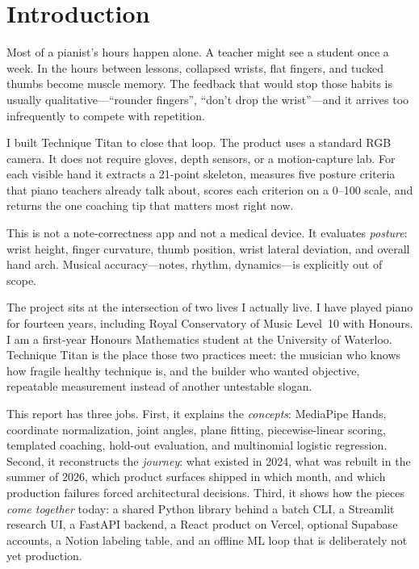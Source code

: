 \documentclass[11pt,a4paper]{article}
\begin{document}
\section{Introduction}

Most of a pianist's hours happen alone.
A teacher might see a student once a week.
In the hours between lessons, collapsed wrists, flat fingers, and tucked thumbs become muscle memory.
The feedback that would stop those habits is usually qualitative---\enquote{rounder fingers}, \enquote{don't drop the wrist}---and it arrives too infrequently to compete with repetition.

I built Technique Titan to close that loop.
The product uses a standard RGB camera.
It does not require gloves, depth sensors, or a motion-capture lab.
For each visible hand it extracts a 21-point skeleton, measures five posture criteria that piano teachers already talk about, scores each criterion on a 0--100 scale, and returns the one coaching tip that matters most right now.

This is not a note-correctness app and not a medical device.
It evaluates \emph{posture}: wrist height, finger curvature, thumb position, wrist lateral deviation, and overall hand arch.
Musical accuracy---notes, rhythm, dynamics---is explicitly out of scope.

The project sits at the intersection of two lives I actually live.
I have played piano for fourteen years, including Royal Conservatory of Music Level~10 with Honours.
I am a first-year Honours Mathematics student at the University of Waterloo.
Technique Titan is the place those two practices meet: the musician who knows how fragile healthy technique is, and the builder who wanted objective, repeatable measurement instead of another untestable slogan.

This report has three jobs.
First, it explains the \emph{concepts}: MediaPipe Hands, coordinate normalization, joint angles, plane fitting, piecewise-linear scoring, templated coaching, hold-out evaluation, and multinomial logistic regression.
Second, it reconstructs the \emph{journey}: what existed in 2024, what was rebuilt in the summer of 2026, which product surfaces shipped in which month, and which production failures forced architectural decisions.
Third, it shows how the pieces \emph{come together} today: a shared Python library behind a batch CLI, a Streamlit research UI, a FastAPI backend, a React product on Vercel, optional Supabase accounts, a Notion labeling table, and an offline ML loop that is deliberately not yet production.
\end{document}
